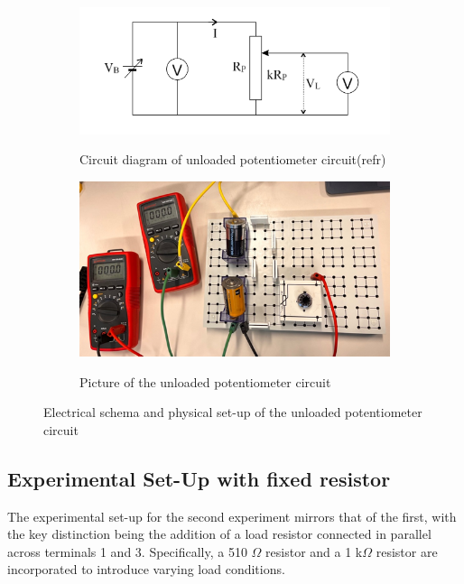 \documentclass[a4paper]{article}
\begin{document}
\begin{figure}[!h]
    \centering
    \begin{subfigure}{.5\textwidth}
        \centering
        \includegraphics[width=0.8\linewidth]{Unloaded pot circuit.png}
        \label{fig:2a}
        \caption{Circuit diagram of unloaded potentiometer circuit(refr)}   
    \end{subfigure}%
    \begin{subfigure}{.5\textwidth}
        \centering
        \includegraphics[width = 0.8\linewidth]{unloaded pot picture.png}
        \label{fig2:b}
        \caption{Picture of the unloaded potentiometer circuit}
    \end{subfigure}
    \caption{Electrical schema and physical set-up of the unloaded potentiometer circuit}
\end{figure}
\subsection{Experimental Set-Up with fixed resistor}
The experimental set-up for the second experiment mirrors that of the first, 
with the key distinction being the addition of a load resistor connected in parallel across terminals 1 and 3.
Specifically, a 510 $\Omega$ resistor and a 1 k$\Omega$ resistor are incorporated to introduce varying load conditions.
\end{document}
